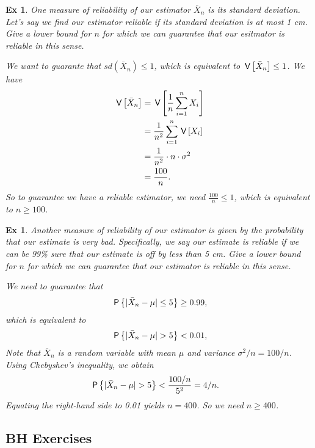 \documentclass[a4paper,11pt]{article}
\newtheorem{exercise}[theorem]{Ex}
\begin{document}
\begin{exercise}
One measure of reliability of our estimator $\bar{X}_n$ is its standard deviation. Let's say we find our estimator reliable if its standard deviation is at most 1 cm. Give a lower bound for $n$ for which we can guarantee that our esitmator is reliable in this sense.
\begin{solution}
We want to guarante that $sd(\bar{X}_n) \leq 1$, which is equivalent to $\V{\bar{X}_n} \leq 1$. We have
\begin{align}
    \V{\bar{X}_n} &= \V{\frac{1}{n}\sum_{i=1}^n X_i} \\
    &= \frac{1}{n^2} \sum_{i=1}^n \V{X_i} \\
    &= \frac{1}{n^2} \cdot n \cdot \sigma^2 \\
    &= \frac{100}{n}.
\end{align}
So to guarantee we have a reliable estimator, we need $\frac{100}{n} \leq 1$, which is equivalent to $n \geq 100$.
\end{solution}
\end{exercise}

\begin{exercise}
Another measure of reliability of our estimator is given by the probability that our estimate is very bad. Specifically, we say our estimate is reliable if we can be 99\% sure that our estimate is off by less than 5 cm. Give a lower bound for $n$ for which we can guarantee that our estimator is reliable in this sense.
\begin{solution}
We need to guarantee that
\begin{align}
    \P{| \bar{X}_n - \mu | \leq 5} \geq 0.99,
\end{align}
which is equivalent to
\begin{align}
    \P{| \bar{X}_n - \mu | > 5} < 0.01,
\end{align}
Note that $\bar{X}_n$ is a random variable with mean $\mu$ and variance $\sigma^2/n = 100/n$. Using Chebyshev's inequality, we obtain
\begin{align}
    \P{| \bar{X}_n - \mu | > 5} &< \frac{100/n}{5^2} = 4/n.
\end{align}
Equating the right-hand side to 0.01 yields $n=400$. So we need $n \geq 400$.
\end{solution}
\end{exercise}


\subsection{BH Exercises}
\end{document}
